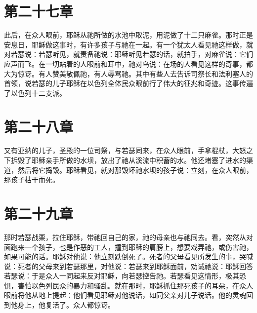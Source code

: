 
\section{第二十七章}

此后，在众人眼前，耶稣从祂所做的水池中取泥，用泥做了十二只麻雀。那时正是安息日，耶稣做这事时，有许多孩子与祂在一起。有一个犹太人看见祂这样做，就对若瑟说：若瑟听见，就责备祂说：耶稣听见若瑟的话，就拍手，对麻雀说：它们应声而飞。在一切站着的人眼前和耳中，祂对鸟说：在场的人看见这样的奇事，都大为惊讶。有人赞美敬佩祂，有人辱骂祂。其中有些人去告诉司祭长和法利塞人的首领，说若瑟的儿子耶稣在以色列全体民众眼前行了伟大的征兆和奇迹。这事传遍了以色列十二支派。\par


\section{第二十八章}

又有亚纳的儿子，圣殿的一位司祭，与若瑟同来，在众人眼前，手拿棍杖，大怒之下拆毁了耶稣亲手所做的水坝，放出了祂从溪流中积蓄的水。他还堵塞了进水的渠道，然后将它捣毁。耶稣看见，就对那毁坏祂水坝的孩子说：立刻，在众人眼前，那孩子枯干而死。\par


\section{第二十九章}

那时若瑟战栗，拉住耶稣，带祂回自己的家，祂的母亲也与祂同去。看，突然从对面跑来一个孩子，也是作恶的工人，撞到耶稣的肩膀上，想要戏弄祂，或伤害祂，如果可能的话。耶稣对他说：他立刻跌倒死了。死者的父母看见所发生的事，哭喊说：死者的父母来到若瑟那里，对他说：若瑟来到耶稣面前，劝诫祂说：耶稣回答若瑟说：于是众人一同起来反对耶稣，向若瑟控告祂。若瑟看见这情形，极其恐惧，害怕以色列民众的暴力和骚乱。就在那时，耶稣抓住那死孩子的耳朵，在众人眼前将他从地上提起：他们看见耶稣对他说话，如同父亲对儿子说话。他的灵魂回到他身上，他复活了。众人都惊讶。\par

